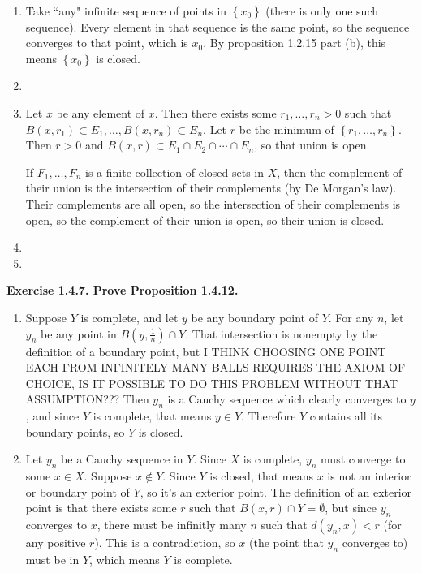 \documentclass{article}
\begin{document}
\begin{enumerate}[label=(\alph*)]
    \item Take ``any" infinite sequence of points in $ \left\{ x_0 \right\}$ (there is only one such sequence). Every element in that sequence is the same point, so the sequence converges to that point, which is $x_0$. By proposition 1.2.15 part (b), this means $ \left\{ x_0 \right\}$ is closed.
    \item
    \item Let $x$ be any element of $x$. Then there exists some $r_1, \dots, r_n > 0$ such that $B(x, r_1) \subset E_1, \dots, B(x, r_n) \subset E_n$. Let $r$ be the minimum of $ \left\{ r_1, \dots, r_n \right\}$. Then $r>0$ and $B(x, r) \subset E_1 \cap E_2 \cap \cdots \cap E_n$, so that union is open.
        \par
        If $F_1, \dots, F_n$ is a finite collection of closed sets in $X$, then the complement of their union is the intersection of their complements (by De Morgan's law). Their complements are all open, so the intersection of their complements is open, so the complement of their union is open, so their union is closed.
    \item
    \item
\end{enumerate}

\textbf{Exercise 1.4.7. Prove Proposition 1.4.12.}
\begin{enumerate}[label=(\alph*)]
    \item Suppose $Y$ is complete, and let $y$ be any boundary point of $Y$. For any $n$, let $y_n$ be any point in $B(y, \frac{1}{n}) \cap Y$. That intersection is nonempty by the definition of a boundary point, but I THINK CHOOSING ONE POINT EACH FROM INFINITELY MANY BALLS REQUIRES THE AXIOM OF CHOICE, IS IT POSSIBLE TO DO THIS PROBLEM WITHOUT THAT ASSUMPTION??? Then $y_n$ is a Cauchy sequence which clearly converges to $y$, and since $Y$ is complete, that means $y \in Y$. Therefore $Y$ contains all its boundary points, so $Y$ is closed.
    \item Let $y_n$ be a Cauchy sequence in $Y$. Since $X$ is complete, $y_n$ must converge to some $x \in X$. Suppose $x \not\in Y$. Since $Y$ is closed, that means $x$ is not an interior or boundary point of $Y$, so it's an exterior point. The definition of an exterior point is that there exists some $r$ such that $B(x, r) \cap Y = \emptyset$, but since $y_n$ converges to $x$, there must be infinitly many $n$ such that $d(y_n, x) < r$ (for any positive $r$). This is a contradiction, so $x$ (the point that $y_n$ converges to) must be in $Y$, which means $Y$ is complete.
\end{enumerate}
\end{document}
